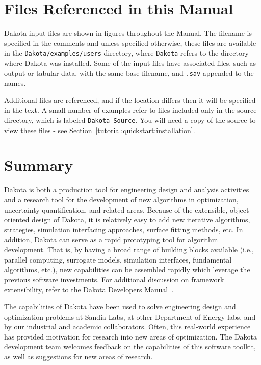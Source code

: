 \section{Files Referenced in this Manual}\label{intro:files}
Dakota input files are shown in figures throughout the Manual. 
The filename is specified in the comments
and unless specified otherwise, these
files are available in the {\tt Dakota/examples/users} directory,
where {\tt Dakota} refers to the directory where Dakota was installed. Some
of the input files have associated files, such as output or tabular data,
with the same base filename, and {\tt .sav} appended to the names.

Additional files are referenced, and if the location differs then it will
be specified in the text.
A small number of examples refer to files included only in the source
directory, which is labeled {\tt Dakota\_Source}. You will need a copy of
the source to view these files - see Section~\ref{tutorial:quickstart:installation}.

\section{Summary}\label{intro:summary}

Dakota is both a production tool for engineering design and analysis
activities and a research tool for the development of new algorithms
in optimization, uncertainty quantification, and related areas.
Because of the extensible, object-oriented design of Dakota, it is
relatively easy to add new iterative algorithms, strategies,
simulation interfacing approaches, surface fitting methods, etc. In
addition, Dakota can serve as a rapid prototyping tool for algorithm
development. That is, by having a broad range of building blocks
available (i.e., parallel computing, surrogate models, simulation
interfaces, fundamental algorithms, etc.), new capabilities can be
assembled rapidly which leverage the previous software investments.
For additional discussion on framework extensibility, refer to the
Dakota Developers Manual~\cite{DevMan}.

The capabilities of Dakota have been used to solve engineering design
and optimization problems at Sandia Labs, at other Department of
Energy labs, and by our industrial and academic collaborators. Often,
this real-world experience has provided motivation for research into
new areas of optimization. The Dakota development team welcomes
feedback on the capabilities of this software toolkit, as well as
suggestions for new areas of research.

